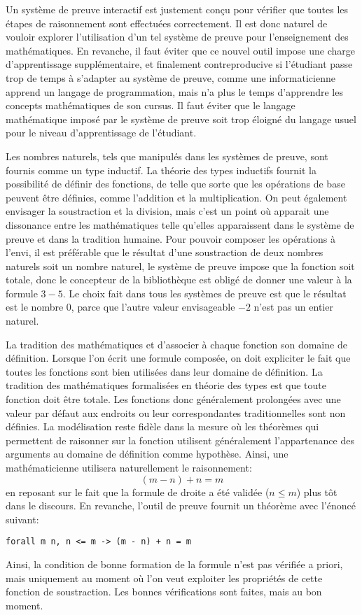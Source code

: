 \documentclass[draft]{jflart}
\begin{document}
Un système de preuve interactif est justement conçu pour vérifier que toutes
les étapes de raisonnement sont effectuées correctement.  Il est donc
naturel de vouloir explorer l'utilisation d'un tel système de preuve
pour l'enseignement des mathématiques.  En revanche, il faut éviter
que ce nouvel outil impose une charge d'apprentissage supplémentaire,
et finalement contreproducive si l'étudiant passe trop de temps à
s'adapter au système de preuve, comme une informaticienne apprend un
langage de programmation, mais n'a plus le temps d'apprendre les
concepts mathématiques de son cursus.  Il faut éviter que le langage
mathématique imposé par le système de preuve soit trop éloigné du
langage usuel pour le niveau d'apprentissage de l'étudiant.

Les nombres naturels, tels que manipulés dans les systèmes de preuve,
sont fournis comme un type inductif.  La théorie des types inductifs
fournit la possibilité de définir des fonctions, de telle que sorte
que les opérations de base peuvent être définies, comme l'addition et
la multiplication.  On peut également envisager la soustraction et la
division, mais c'est un point où apparait une dissonance entre les
mathématiques telle qu'elles apparaissent dans le système de preuve et
dans la tradition humaine.  Pour pouvoir composer les opérations à
l'envi, il est préférable que le résultat d'une soustraction de deux
nombres naturels soit un nombre naturel, le système de preuve impose
que la fonction soit totale, donc le concepteur de la bibliothèque est
obligé de donner une valeur à la formule \(3 - 5\).  Le choix fait
dans tous les systèmes de preuve est que le résultat est le nombre
\(0\), parce que l'autre valeur envisageable \(-2\) n'est pas un
entier naturel.

La tradition des mathématiques et d'associer à chaque fonction son
domaine de définition.  Lorsque l'on écrit une formule composée, on
doit expliciter le fait que toutes les fonctions sont bien utilisées
dans leur domaine de définition.  La tradition des mathématiques
formalisées en théorie des types est que toute fonction doit être
totale.  Les fonctions donc généralement prolongées avec une valeur
par défaut aux endroits ou leur correspondantes traditionnelles sont
non définies.  La modélisation reste fidèle dans la mesure où les
théorèmes qui permettent de raisonner sur la fonction utilisent
généralement l'appartenance des arguments au domaine de définition
comme hypothèse.  Ainsi, une mathématicienne utilisera naturellement
le raisonnement:
\[(m - n) + n = m\]
en reposant sur le fait que la formule de droite a été validée (\(n
\leq m\)) plus tôt dans le discours.  En revanche, l'outil de preuve
fournit un théorème avec l'énoncé suivant:
\begin{verbatim}
forall m n, n <= m -> (m - n) + n = m
\end{verbatim}
Ainsi, la condition de bonne formation de la formule n'est pas
vérifiée a priori, mais uniquement au moment où l'on veut exploiter
les propriétés de cette fonction de soustraction.  Les bonnes
vérifications sont faites, mais au bon moment.
\end{document}
